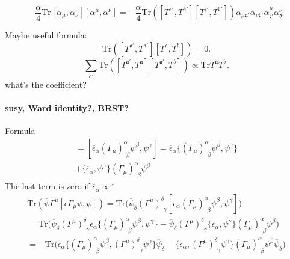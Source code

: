 \[
	-\frac{\alpha}{4} \mathrm{Tr} 
		[\alpha_\mu,\alpha_\nu][\alpha^\mu,\alpha^\nu] 
		= -\frac{\alpha}{4}	\mathrm{Tr}([T^{\mathfrak{a}'},T^{\mathfrak{b}'}]
			[T^{\mathfrak{c}'},T^{\mathfrak{d}'}])
			\alpha_{\mu \mathfrak{a}'} \alpha_{\nu \mathfrak{b}'}
		\alpha^{\mu }_{\mathfrak{c}'} \alpha^\nu_{\mathfrak{d}'}
	\]
\begin{info}
	Maybe useful formula:
	\[
		\mathrm{Tr}
		\left( [T^{\mathfrak{a}'},T^{\mathfrak{a}'}]
		[T^{\mathfrak{a}},T^b]\right) 
		=0
	.\] 
	\[
		\sum_{\mathfrak{a}'} \mathrm{Tr}
		\left( [T^{\mathfrak{a}'},T^{\mathfrak{a}}]
		[T^{\mathfrak{a}'},T^b]\right) 
		\propto \mathrm{Tr} T^{\mathfrak{a}} T^{\mathfrak{b}}
	.\] 
	what's the coefficient?
\end{info}

\paragraph{susy, Ward identity?, BRST?}
Formula
\begin{align*}
	[ \overline{\epsilon} \Gamma_\mu \psi,\psi]
	= [ \overline{\epsilon}_\alpha (\Gamma_\mu)^\alpha_{~~\beta} \psi^\beta,
	\psi^\gamma]
	= \overline{\epsilon}_\alpha\{ (\Gamma_\mu)^\alpha_{~~\beta} \psi^\beta,
	\psi^\gamma\} \\
	+ \{ \overline{\epsilon}_\alpha,\psi^\gamma\}
(\Gamma_\mu)^\alpha_{~~\beta} \psi^\beta
\end{align*}
The last term is zero if $\overline{\epsilon}_\alpha \propto \mathds{1}$.
\begin{align*}
	\mathrm{Tr}(\overline{\psi}\Gamma^\mu [ \overline{\epsilon}
	\Gamma_\mu \psi,\psi])
	= \mathrm{Tr} \bigg( \overline{\psi}_\delta (\Gamma^\mu)^\delta_{~~\gamma}
	[ \overline{\epsilon}_\alpha (\Gamma_\mu)^\alpha_{~~\beta} \psi^\beta,
	\psi^\gamma]\bigg) \\
	= \mathrm{Tr} \bigg( \overline{\psi}_\delta (\Gamma^\mu)^\delta_{~~\gamma}
	\overline{\epsilon}_\alpha\{ (\Gamma_\mu)^\alpha_{~~\beta} \psi^\beta,
	\psi^\gamma\} - \overline{\psi}_\delta (\Gamma^\mu)^\delta_{~~\gamma}
	\{ \overline{\epsilon}_\alpha,\psi^\gamma\}
	(\Gamma_\mu)^\alpha_{~~\beta} \psi^\beta
	\bigg)\\
	= - \mathrm{Tr} \bigg( 	\overline{\epsilon}_\alpha
		\big\{ 
			(\Gamma_\mu)^\alpha_{~~\beta} \psi^\beta,
		 (\Gamma^\mu)^\delta_{~~\gamma} \psi^\gamma
	 \big\} 
	 \overline{\psi}_\delta 
	 - 	\big\{ 
		 \overline{\epsilon}_\alpha, 
		 (\Gamma^\mu)^\delta_{~~\gamma}\psi^\gamma
	 \big\}
	(\Gamma_\mu)^\alpha_{~~\beta} \psi^\beta
	\overline{\psi}_\delta 	\bigg)
\end{align*}
